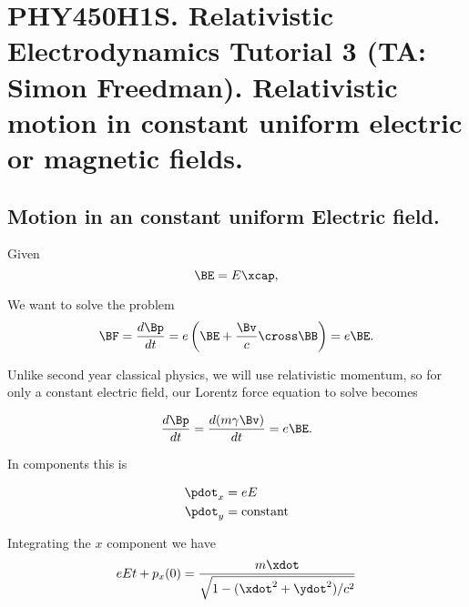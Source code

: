 
%

\chapter{PHY450H1S.  Relativistic Electrodynamics Tutorial 3 (TA: Simon Freedman).  Relativistic motion in constant uniform electric or magnetic fields.}
\label{chap:relativisticElectrodynamicsT3}
{}
\date{Feb 3, 2011}

\beginArtWithToc

\section{Motion in an constant uniform Electric field.}

Given
\begin{equation}\label{eqn:relativisticElectrodynamicsT3:}
\BE = E \xcap,
\end{equation}

We want to solve the problem
\begin{equation}\label{eqn:relativisticElectrodynamicsT3:20}
\BF = \frac{d\Bp}{dt} =
e \left( \BE + \frac{\Bv}{c} \cross \BB \right) = e \BE.
\end{equation}

Unlike second year classical physics, we will use relativistic momentum, so for only a constant electric field, our Lorentz force equation to solve becomes

\begin{equation}\label{eqn:relativisticElectrodynamicsT3:40}
\frac{d\Bp}{dt} = \frac{d (m \gamma \Bv)}{dt} = e \BE.
\end{equation}

In components this is

\begin{align}\label{eqn:relativisticElectrodynamicsT3:60}
\pdot_x &= e E \\
\pdot_y &= \text{constant}
\end{align}

Integrating the $x$ component we have
\begin{equation}\label{eqn:relativisticElectrodynamicsT3:65}
e E t + p_x(0)
=
\frac{m \xdot}{\sqrt{1 - (\xdot^2 + \ydot^2)/c^2}} 
\end{equation}

